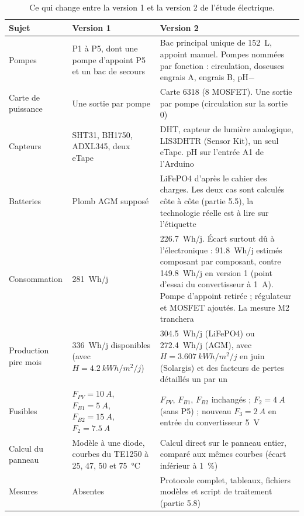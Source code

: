 \begin{table}[H]
\centering
\small
\begin{tabularx}{\textwidth}{|>{\raggedright\arraybackslash}p{2.6cm}|Y|Y|}
\hline
\textbf{Sujet} & \textbf{Version 1} & \textbf{Version 2} \\
\hline
Pompes & P1 à P5, dont une pompe d'appoint P5 et un bac de secours & Bac principal unique de \qty{152}{L}, appoint manuel. Pompes nommées par fonction : circulation, doseuses engrais A, engrais B, pH$-$ \\
\hline
Carte de puissance & Une sortie par pompe & Carte 6318 (8 MOSFET). Une sortie par pompe (circulation sur la sortie 0) \\
\hline
Capteurs & SHT31, BH1750, ADXL345, deux eTape & DHT, capteur de lumière analogique, LIS3DHTR (Sensor Kit), un seul eTape. pH sur l'entrée A1 de l'Arduino \\
\hline
Batteries & Plomb AGM supposé & LiFePO4 d'après le cahier des charges. Les deux cas sont calculés côte à côte (partie 5.5), la technologie réelle est à lire sur l'étiquette \\
\hline
Consommation & \qty{281}{Wh/j} & \qty{226,7}{Wh/j}. Écart surtout dû à l'électronique : \qty{91,8}{Wh/j} estimés composant par composant, contre \qty{149,8}{Wh/j} en version 1 (point d'essai du convertisseur à \qty{1}{A}). Pompe d'appoint retirée ; régulateur et MOSFET ajoutés. La mesure M2 tranchera \\
\hline
Production pire mois & \qty{336}{Wh/j} disponibles (avec $H = \qty{4,2}{kWh/m^2/j}$) & \qty{304,5}{Wh/j} (LiFePO4) ou \qty{272,4}{Wh/j} (AGM), avec $H = \qty{3,607}{kWh/m^2/j}$ en juin (Solargis) et des facteurs de pertes détaillés un par un \\
\hline
Fusibles & $F_{PV} = \qty{10}{A}$, $F_{B1} = \qty{5}{A}$, $F_{B2} = \qty{15}{A}$, $F_2 = \qty{7,5}{A}$ & $F_{PV}$, $F_{B1}$, $F_{B2}$ inchangés ; $F_2 = \qty{4}{A}$ (sans P5) ; nouveau $F_3 = \qty{2}{A}$ en entrée du convertisseur \qty{5}{V} \\
\hline
Calcul du panneau & Modèle à une diode, courbes du TE1250 à 25, 47, 50 et \qty{75}{\celsius} & Calcul direct sur le panneau entier, comparé aux mêmes courbes (écart inférieur à \qty{1}{\percent}) \\
\hline
Mesures & Absentes & Protocole complet, tableaux, fichiers modèles et script de traitement (partie 5.8) \\
\hline
\end{tabularx}
\caption{Ce qui change entre la version 1 et la version 2 de l'étude électrique.}
\end{table}

